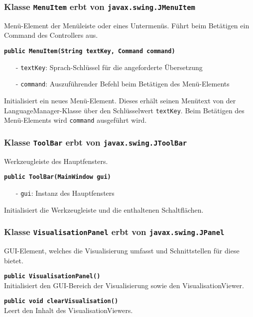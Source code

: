 \documentclass[parskip=full,11pt,twoside]{scrartcl}
\begin{document}
\subsubsection{Klasse \texttt{MenuItem} erbt von \texttt{javax.swing.JMenuItem}}

Menü-Element der Menüleiste oder eines Untermenüs. Führt beim Betätigen ein Command des Controllers aus.

\textbf{\texttt{public MenuItem(String textKey, Command command)}}
\begin{itemize}[noitemsep]
	\item[-] \texttt{textKey}: Sprach-Schlüssel für die angeforderte Übersetzung
	\item[-] \texttt{command}: Auszuführender Befehl beim Betätigen des Menü-Elements
\end{itemize}
Initialisiert ein neues Menü-Element. Dieses erhält seinen Menütext von der LanguageManager-Klasse über den Schlüsselwert \texttt{textKey}. Beim Betätigen des Menü-Elements wird \texttt{command} ausgeführt wird.

\subsubsection{Klasse \texttt{ToolBar} erbt von \texttt{javax.swing.JToolBar}}

Werkzeugleiste des Hauptfensters.

\textbf{\texttt{public ToolBar(MainWindow gui)}}
\begin{itemize}[noitemsep]
	\item[-] \texttt{gui}: Instanz des Hauptfensters
\end{itemize}
Initialisiert die Werkzeugleiste und die enthaltenen Schaltflächen.

\subsubsection{Klasse \texttt{VisualisationPanel} erbt von \texttt{javax.swing.JPanel}}

GUI-Element, welches die Visualisierung umfasst und Schnittstellen für diese bietet.

\textbf{\texttt{public VisualisationPanel()}}\\
Initialisiert den GUI-Bereich der Visualisierung sowie den VisualisationViewer.

\textbf{\texttt{public void clearVisualisation()}}\\
Leert den Inhalt des VisualisationViewers.
\end{document}
